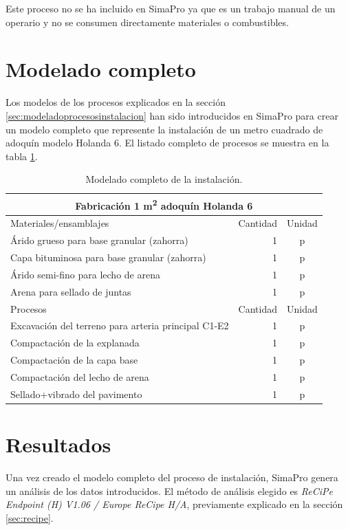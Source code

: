Este proceso no se ha incluido en SimaPro ya que es un trabajo manual de un operario y no se consumen directamente materiales o combustibles.

\section{Modelado completo}

Los modelos de los procesos explicados en la sección \ref{sec:modeladoprocesosinstalacion} han sido introducidos en SimaPro para crear un modelo completo que represente la instalación de un metro cuadrado de adoquín modelo Holanda 6. El listado completo de procesos se muestra en la tabla \ref{modeladocompletoinstalacion}.

\begin{table}[!htb]
\centering
\begin{tabular}{p{8cm}rc}
\toprule
\multicolumn{3}{c}{Fabricación 1 \si{m^2} adoquín Holanda 6}\\
\midrule
Materiales/ensamblajes & Cantidad & Unidad\\
\midrule
Árido grueso para base granular (zahorra) & 1 & p\\
Capa bituminosa para base granular (zahorra) & 1 & p\\
Árido semi-fino para lecho de arena & 1 & p\\
Arena para sellado de juntas & 1 & p\\
\midrule
Procesos & Cantidad & Unidad\\
\midrule
Excavación del terreno para arteria principal C1-E2 & 1 & p\\
Compactación de la explanada & 1 & p\\
Compactación de la capa base & 1 & p\\
Compactación del lecho de arena & 1 & p\\
Sellado+vibrado del pavimento & 1 & p\\
\bottomrule
\end{tabular}
\caption{Modelado completo de la instalación.}
\label{modeladocompletoinstalacion}
\end{table}

\section{Resultados}

Una vez creado el modelo completo del proceso de instalación, SimaPro genera un análisis de los datos introducidos. El método de análisis elegido es \textit{ReCiPe Endpoint (H) V1.06 / Europe ReCipe H/A}, previamente explicado en la sección \ref{sec:recipe}.

